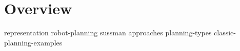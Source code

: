 \chapter{Overview}

{representation}
{robot-planning}
{sussman}
{approaches}
{planning-types}
{classic-planning-examples}
